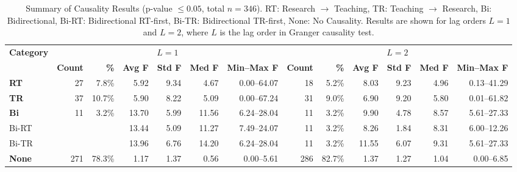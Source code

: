 \documentclass[conference]{IEEEtran}
\begin{document}
\begin{table*}
	\centering
	\caption{Summary of Causality Results (p-value $\leq 0.05$, total $n=346$). RT: Research $\rightarrow$ Teaching, TR: Teaching $\rightarrow$ Research, Bi: Bidirectional, Bi-RT: Bidirectional RT-first, Bi-TR: Bidirectional TR-first, None: No Causality. Results are shown for lag orders $L=1$ and $L=2$, where $L$ is the lag order in Granger causality test.}
	\begin{tabular}{|l|r|r|r|r|r|r|r|r|r|r|r|r|}
		\hline
		\multirow{2}{*}{\textbf{Category}} 
		& \multicolumn{6}{c|}{$L=1$} 
		& \multicolumn{6}{c|}{$L=2$} \\ \cline{2-13}
		& \textbf{Count} & \textbf{\%} & \textbf{Avg F} & \textbf{Std F} & \textbf{Med F} & \textbf{Min--Max F} 
		& \textbf{Count} & \textbf{\%} & \textbf{Avg F} & \textbf{Std F} & \textbf{Med F} & \textbf{Min--Max F} \\ \hline
		\textbf{RT}     & 27  & 7.8\%  & 5.92  & 9.34  & 4.67  & 0.00--64.07  & 18  & 5.2\%  & 8.03  & 9.23  & 4.96  & 0.13--41.29 \\ \hline
		\textbf{TR}     & 37  & 10.7\% & 5.90  & 8.22  & 5.09  & 0.00--67.24  & 31  & 9.0\%  & 6.90  & 9.20  & 5.80  & 0.01--61.82 \\ \hline
		\textbf{Bi}     & 11  & 3.2\%  & 13.70 & 5.99  & 11.56 & 6.24--28.04  & 11  & 3.2\%  & 9.90  & 4.78  & 8.57  & 5.61--27.33 \\ \hline
		\hfill Bi-RT  &   &   & 13.44 & 5.09  & 11.27 & 7.49--24.07  & 11  & 3.2\%  & 8.26  & 1.84  & 8.31  & 6.00--12.26 \\ \hline
		\hfill Bi-TR  &   &   & 13.96 & 6.76  & 14.20 & 6.24--28.04  & 11  & 3.2\%  & 11.55 & 6.07  & 9.31  & 5.61--27.33 \\ \hline
		\textbf{None}   & 271 & 78.3\% & 1.17  & 1.37  & 0.56  & 0.00--5.61   & 286 & 82.7\% & 1.37  & 1.27  & 1.04  & 0.00--6.85  \\ \hline
	\end{tabular}
\end{table*}
\end{document}
